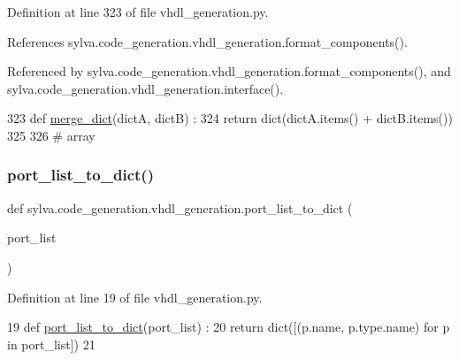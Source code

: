 Definition at line 323 of file vhdl\+\_\+generation.\+py.



References sylva.\+code\+\_\+generation.\+vhdl\+\_\+generation.\+format\+\_\+components().



Referenced by sylva.\+code\+\_\+generation.\+vhdl\+\_\+generation.\+format\+\_\+components(), and sylva.\+code\+\_\+generation.\+vhdl\+\_\+generation.\+interface().


\begin{DoxyCode}
323 \textcolor{keyword}{def }\hyperlink{namespacesylva_1_1code__generation_1_1vhdl__generation_a6f105e19192ce75934f22be90308ceff}{merge\_dict}(dictA, dictB) :
324   \textcolor{keywordflow}{return} dict(dictA.items() + dictB.items())
325 
326 \textcolor{comment}{# array}
\end{DoxyCode}
\mbox{\label{namespacesylva_1_1code__generation_1_1vhdl__generation_a51a60df4116e05e838a7d6c61f434df5}} 
\subsubsection{\texorpdfstring{port\+\_\+list\+\_\+to\+\_\+dict()}{port\_list\_to\_dict()}}
{\footnotesize\ttfamily def sylva.\+code\+\_\+generation.\+vhdl\+\_\+generation.\+port\+\_\+list\+\_\+to\+\_\+dict (\begin{DoxyParamCaption}\item[{}]{port\+\_\+list }\end{DoxyParamCaption})}



Definition at line 19 of file vhdl\+\_\+generation.\+py.


\begin{DoxyCode}
19 \textcolor{keyword}{def }\hyperlink{namespacesylva_1_1code__generation_1_1vhdl__generation_a51a60df4116e05e838a7d6c61f434df5}{port\_list\_to\_dict}(port\_list) :
20   \textcolor{keywordflow}{return} dict([(p.name, p.type.name) \textcolor{keywordflow}{for} p \textcolor{keywordflow}{in} port\_list])
21 
\end{DoxyCode}
\mbox{\label{namespacesylva_1_1code__generation_1_1vhdl__generation_ae2d3d4cc47d3292a63a983c9645c3010}} 
